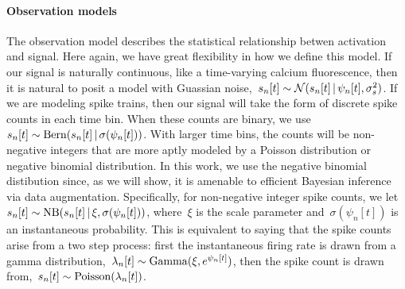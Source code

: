 \paragraph{Observation models}
The observation model describes the statistical relationship betwen activation and signal. 
Here again, we have great flexibility in how we define this model.
If our signal is naturally continuous, like a time-varying calcium fluorescence, then it is natural to posit a model with Guassian noise,~${s_n[t] \sim \mathcal{N}(s_n[t] \,|\, \psi_n[t], \sigma_s^2)}$. 
If we are modeling spike trains, then our signal will take the form of discrete spike counts in each time bin.
When these counts are binary, we use~${s_n[t] \sim \mathrm{Bern}(s_n[t] \,|\, \sigma(\psi_n[t]))}$.
With larger time bins, the counts will be non-negative integers that are more aptly modeled by a Poisson distribution or negative binomial distribution. 
In this work, we use the negative binomial distibution since, as we will show, it is amenable to efficient Bayesian inference via data augmentation. 
Specifically, for non-negative integer spike counts, we let~${s_n[t] \sim \mathrm{NB}(s_{n}[t] \,|\, \xi, \sigma(\psi_n[t]))}$,
where~$\xi$ is the scale parameter and~$\sigma(\psi_n[t])$ is an instantaneous probability. 
This is equivalent to saying that the spike counts arise from a two step process: 
first the instantaneous firing rate is drawn from a gamma distribution,~$\lambda_n[t] \sim \mathrm{Gamma}(\xi, e^{\psi_{n}[t]})$, then the spike count is drawn from,~$s_{n}[t]\sim \mathrm{Poisson}(\lambda_n[t])$.

